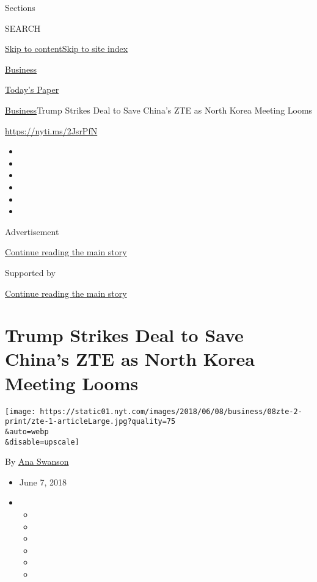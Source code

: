 Sections

SEARCH

\protect\hyperlink{site-content}{Skip to
content}\protect\hyperlink{site-index}{Skip to site index}

\href{https://www.nytimes.com/section/business}{Business}

\href{https://myaccount.nytimes.com/auth/login?response_type=cookie\&client_id=vi}{}

\href{https://www.nytimes.com/section/todayspaper}{Today's Paper}

\href{/section/business}{Business}\textbar{}Trump Strikes Deal to Save
China's ZTE as North Korea Meeting Looms

\url{https://nyti.ms/2JsrPfN}

\begin{itemize}
\item
\item
\item
\item
\item
\item
\end{itemize}

Advertisement

\protect\hyperlink{after-top}{Continue reading the main story}

Supported by

\protect\hyperlink{after-sponsor}{Continue reading the main story}

\hypertarget{trump-strikes-deal-to-save-chinas-zte-as-north-korea-meeting-looms}{%
\section{Trump Strikes Deal to Save China's ZTE as North Korea Meeting
Looms}\label{trump-strikes-deal-to-save-chinas-zte-as-north-korea-meeting-looms}}

\texttt{[image: https://static01.nyt.com/images/2018/06/08/business/08zte-2-print/zte-1-articleLarge.jpg?quality=75\\\&auto=webp\\\&disable=upscale]}

By \href{https://www.nytimes.com/by/ana-swanson}{Ana Swanson}

\begin{itemize}
\item
  June 7, 2018
\item
  \begin{itemize}
  \item
  \item
  \item
  \item
  \item
  \item
  \end{itemize}
\end{itemize}

